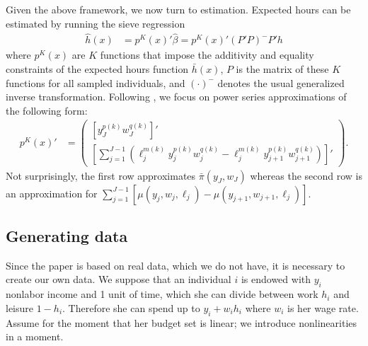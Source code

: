 \documentclass[11pt,letterpaper]{article}                  %
\begin{document}
Given the above framework, we now turn to estimation.
Expected hours can be estimated by running the sieve regression
\begin{align*}
	\hat{h}(x) &= p^K (x)' \hat{\beta} = p^K (x)' (P' P)^- P' h
\end{align*}
where $p^K (x)$ are $K$ functions that impose the additivity and equality constraints of the expected hours function $\bar{h} (x)$, $P$ is the matrix of these $K$ functions for all sampled individuals, and $(\cdot)^-$ denotes the usual generalized inverse transformation.
Following \citet{Blomquist2002}, we focus on power series approximations of the following form:
\begin{align*}
	p^K (x)' &= \begin{pmatrix}
		\left[ y_J^{p(k)} w_J^{q(k)} \right] ' \\
		\left[ \sum_{j=1}^{J-1} \left( \ell_j^{m(k)} y_j^{p(k)} w_j^{q(k)} - \ell_j^{m(k)} y_{j+1}^{p(k)} w_{j+1}^{q(k)} \right) \right]'
	\end{pmatrix}.
\end{align*}
Not surprisingly, the first row approximates $\bar{\pi} (y_J, w_J)$ whereas the second row is an approximation for $\sum_{j=1}^{J-1} [\mu(y_j, w_j, \ell_j) - \mu(y_{j+1}, w_{j+1}, \ell_j)]$.

\subsection{Generating data}
Since the paper is based on real data, which we do not have, it is necessary to create our own data.
We suppose that an individual $i$ is endowed with $y_i$ nonlabor income and 1 unit of time, which she can divide between work $h_i$ and leisure $1-h_i$.
Therefore she can spend up to $y_i + w_i h_i$ where $w_i$ is her wage rate.
Assume for the moment that her budget set is linear; we introduce nonlinearities in a moment.
\end{document}
